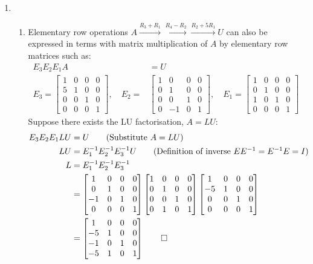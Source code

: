 \documentclass[12pt, a4paper]{article}
\begin{document}
\begin{enumerate}[Q\arabic*.]
  \item \begin{enumerate}[(\alph*)]
      \item Elementary row operations $A\xrightarrow{R_3+R_1}\xrightarrow{R_4-R_2}\xrightarrow{R_2+5R_1}U$ can also be expressed in terms with matrix multiplication of $A$ by elementary row matrices such as:
      \begin{align*}
        E_3E_2E_1A &= U \\
        E_3 = \begin{bmatrix}1&0&0&0\\5&1&0&0\\0&0&1&0\\0&0&0&1\end{bmatrix}
        ,\quad E_2 = &\begin{bmatrix}1&0&0&0\\0&1&0&0\\0&0&1&0\\0&-1&0&1\end{bmatrix}
        ,\quad E_1 = \begin{bmatrix}1&0&0&0\\0&1&0&0\\1&0&1&0\\0&0&0&1\end{bmatrix}
      \end{align*}
      Suppose there exists the LU factorisation, $A = LU$:
      \begin{align*}
        E_3E_2E_1LU &= U\tag*{(Substitute $A=LU$)}\\
        LU &= E_1^{-1}E_2^{-1}E_3^{-1}U\tag*{(Definition of inverse $EE^{-1} = E^{-1}E = I$)}\\ 
        L &= E_1^{-1}E_2^{-1}E_3^{-1} \\
          &= \begin{bmatrix}1&0&0&0\\0&1&0&0\\-1&0&1&0\\0&0&0&1\end{bmatrix} \begin{bmatrix}1&0&0&0\\0&1&0&0\\0&0&1&0\\0&1&0&1\end{bmatrix}  \begin{bmatrix}1&0&0&0\\-5&1&0&0\\0&0&1&0\\0&0&0&1\end{bmatrix}\\
          &= \begin{bmatrix}1&0&0&0\\-5&1&0&0\\-1&0&1&0\\-5&1&0&1\end{bmatrix} \qed
      \end{align*}


\end{enumerate}
\end{enumerate}
\end{document}
